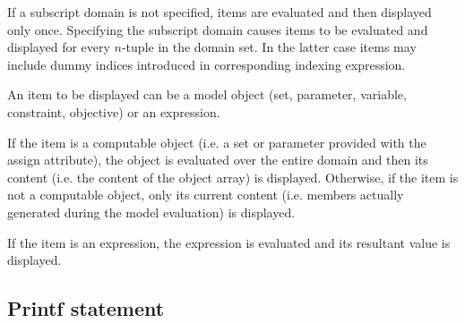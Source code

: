\documentclass[10pt]{article}
\begin{document}
If a subscript domain is not specified, items are evaluated and then
displayed only once. Specifying the subscript domain causes items to be
evaluated and displayed for every $n$-tuple in the domain set. In the
latter case items may include dummy indices introduced in corresponding
indexing expression.

An item to be displayed can be a model object (set, parameter, variable,
constraint, objective) or an expression.

If the item is a computable object (i.e. a set or parameter provided
with the assign attribute), the object is evaluated over the entire
domain and then its content (i.e. the content of the object array) is
displayed. Otherwise, if the item is not a computable object, only its
current content (i.e. members actually generated during the model
evaluation) is displayed.

If the item is an expression, the expression is evaluated and its
resultant value is displayed.

\subsection{Printf statement}

\medskip


\setlength{\leftmargini}{60pt}
\end{document}
